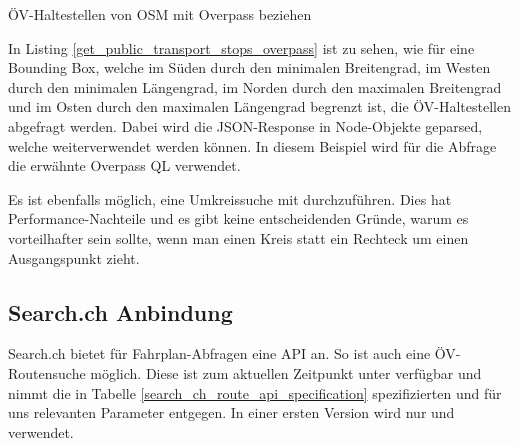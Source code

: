 \begin{listing}[ht]
    \inputminted{python}{projectdoc/listing/get_public_transport_stops_overpass.py}
    \caption{ÖV-Haltestellen von \acs{OSM} mit Overpass beziehen}
    \label{get_public_transport_stops_overpass}
\end{listing}

In Listing \ref{get_public_transport_stops_overpass} ist zu sehen, wie für eine Bounding Box, welche im Süden durch den minimalen Breitengrad, im Westen durch den minimalen Längengrad, im Norden durch den maximalen Breitengrad und im Osten durch den maximalen Längengrad begrenzt ist, die ÖV-Haltestellen abgefragt werden. Dabei wird die JSON-Response in Node-Objekte geparsed, welche weiterverwendet werden können. In diesem Beispiel wird für die Abfrage die erwähnte Overpass QL verwendet.

Es ist ebenfalls möglich, eine Umkreissuche mit  durchzuführen. Dies hat Performance-Nachteile und es gibt keine entscheidenden Gründe, warum es vorteilhafter sein sollte, wenn man einen Kreis statt ein Rechteck um einen Ausgangspunkt zieht.

\subsection{Search.ch Anbindung}
\label{analyse:Search.ch Anbindung}
Search.ch bietet für Fahrplan-Abfragen eine API \cite{search_ch_route_api} an. So ist  auch eine ÖV-Routensuche möglich. Diese ist zum aktuellen Zeitpunkt unter \cite{search_ch_route_api} verfügbar und nimmt die in Tabelle \ref{search_ch_route_api_specification} spezifizierten und für uns relevanten Parameter entgegen. In einer ersten Version wird nur  und  verwendet.

